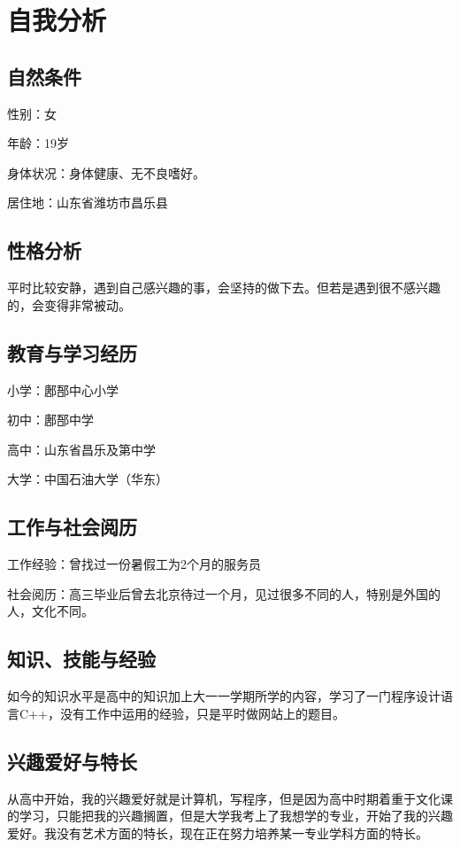 \documentclass{article}
\begin{document}
\thispagestyle{empty}
\newpage
\setcounter{page}{1}
\section{自我分析}
	\par
\subsection{自然条件}
\par
性别：女\par
年龄：19岁\par
身体状况：身体健康、无不良嗜好。\par
居住地：山东省潍坊市昌乐县\par

\subsection{性格分析}
\par
平时比较安静，遇到自己感兴趣的事，会坚持的做下去。但若是遇到很不感兴趣的，会变得非常被动。\par
\subsection{教育与学习经历}
\par
小学：鄌郚中心小学\par
初中：鄌郚中学\par
高中：山东省昌乐及第中学\par
大学：中国石油大学（华东）\par

\subsection{工作与社会阅历}
\par
工作经验：曾找过一份暑假工为2个月的服务员\par
社会阅历：高三毕业后曾去北京待过一个月，见过很多不同的人，特别是外国的人，文化不同。
\par
\subsection{知识、技能与经验}
\par
如今的知识水平是高中的知识加上大一一学期所学的内容，学习了一门程序设计语言C++，没有工作中运用的经验，只是平时做网站上的题目。\par
\subsection{兴趣爱好与特长}
\par
从高中开始，我的兴趣爱好就是计算机，写程序，但是因为高中时期着重于文化课的学习，只能把我的兴趣搁置，但是大学我考上了我想学的专业，开始了我的兴趣爱好。我没有艺术方面的特长，现在正在努力培养某一专业学科方面的特长。\par
\end{document}
